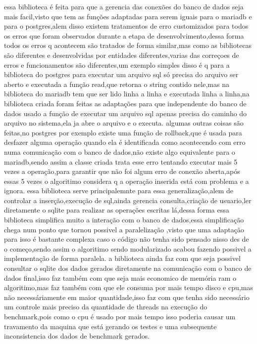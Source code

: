 \documentclass[
	12pt,				%
	openright,			%
	oneside,			%
	a4paper,			%
	english,			%
	french,				%
	spanish,			%
	brazil,				%
	]{abntex2}
\begin{document}
essa biblioteca é feita para que a gerencia das conexões do banco de dados seja mais facil,visto que tem as funções adaptadas para serem iguais para o mariadb e para o postgres,alem disso existem tratamentos de erro customizados para todos os erros que foram observados durante a etapa de desenvolvimento,dessa forma todos os erros q acontecem são tratados de forma similar,mas como as bibliotecas são diferentes e desenvolvidas por entidades diferentes,varias das correçoes de erros e funcionamentos são diferentes,um exemplo simples disso é q para a biblioteca do postgres para executar um arquivo sql só precisa do arquivo ser aberto e executada a função read,que retorna o string contido nele,mas na biblioteca do mariadb tem que ser lido linha a linha e executada linha a linha,na biblioteca criada foram feitas as adaptações para que independente do banco de dados usado a função de executar um arquivo sql apenas precisa do caminho do arquivo no sistema,ela ja abre o arquivo e o executa.
algumas outras coisas são feitas,no postgres por exemplo existe uma função de rollback,que é usada para desfazer alguma operação quando ela é identificada como acontecendo com erro numa comunicação com o banco de dados,não existe algo equivalente para o mariadb,sendo assim a classe criada trata esse erro tentando executar mais 5 vezes a operação,para garantir que não foi algum erro de conexão aberta,após essas 5 vezes o algoritimo considera q a operação inserida está com problema e a ignora.
essa biblioteca serve principalemnte para essa generalização,alem de controlar a inserção,execução de sql,ainda gerencia consulta,criação de usuario,ler diretamente o sqlite para realizar as operações escritas lá,dessa forma essa biblioteca simplifica muito a interação com o banco de dados,essa simplificação chega num ponto que tornou possivel a paralelização ,visto que uma adaptação para isso é bastante complexa caso o código não tenha sido pensado nisso des de o começo,sendo assim o algoritimo sendo modularizado acabou fazendo possivel a implementação de forma paralela.
a biblioteca ainda faz com que seja possivel consultar o sqlite dos dados gerados diretamente na comunicação com o banco de dados final,isso faz também com que seja mais economico de memória ram o algoritimo,mas faz também com que ele consuma por mais tempo disco e cpu,mas não necessáriamente em maior quantidade,isso faz com que tenha sido necessário um controle mais preciso da quantidade de threads na execução do benchmark,pois como o cpu é usado por mais tempo isso poderia causar um travamento da maquina que está gerando os testes e uma subsequente inconsistencia dos dados de benchmark gerados.
\end{document}
